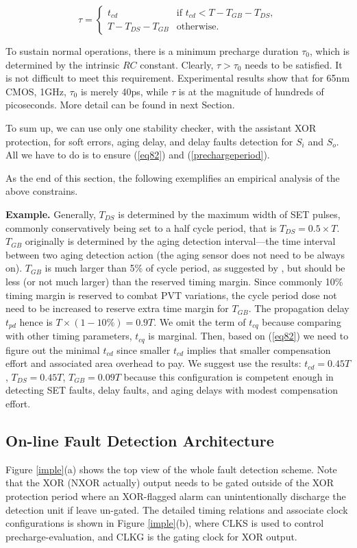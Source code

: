 \[\label{tao}
\tau = \left\{
\begin{array}{ll}
 t_{cd} & \mbox{if } t_{cd}<T-T_{GB}-T_{DS}, \\
 T-T_{DS}-T_{GB} & \mbox{otherwise}.
 \end{array} \right.
\]

To sustain normal operations, there is a minimum precharge duration $\tau_0$, which is determined by the intrinsic $RC$ constant. Clearly, $\tau > \tau_0$ needs to be satisfied. It is not difficult to meet this requirement. Experimental results show that for 65nm CMOS, 1GHz, $\tau_0$ is merely 40ps, while $\tau$ is at the magnitude of hundreds of picoseconds. More detail can be found in next Section.

To sum up, we can use only one stability checker, with the assistant XOR protection, for soft errors, aging delay, and delay faults detection for $S_i$ and $S_o$. All we have to do is to ensure (\ref{eq82}) and (\ref{prechargeperiod}).

As the end of this section, the following exemplifies an empirical analysis of the above constrains.

\vspace{0.3cm} {\bf Example.} Generally, $T_{DS}$ is determined by the maximum width of SET pulses, commonly conservatively being set to a half cycle period, that is $T_{DS}=0.5\times T$. $T_{GB}$ originally is determined by the aging detection interval---the time interval between two aging detection action (the aging sensor does not need to be always on).  $T_{GB}$ is much larger than 5\% of cycle period, as suggested by \cite{agarwal2007circuit}, but should be less (or not much larger) than the reserved timing margin. Since commonly 10\% timing margin is reserved to combat PVT variations, the cycle period dose not need to be increased to reserve extra time margin for $T_{GB}$. The propagation delay $t_{pd}$ hence is $T\times(1-10\%)=0.9T$. We omit the term of $t_{cq}$ because comparing with other timing parameters, $t_{cq}$ is marginal. Then, based on (\ref{eq82}) we need to figure out the minimal $t_{cd}$ since smaller $t_{cd}$ implies that smaller compensation effort and associated area overhead to pay. We suggest use the results: $t_{cd}=0.45T$, $T_{DS} = 0.45T$, $T_{GB}=0.09T$ because this configuration is competent enough in detecting SET faults, delay faults, and aging delays with modest compensation effort.

\subsection{On-line Fault Detection Architecture}
Figure \ref{imple}(a) shows the top view  of the whole fault detection scheme. Note that the XOR (NXOR actually) output needs to be gated outside of the XOR protection period where an XOR-flagged alarm can unintentionally discharge the detection unit if leave un-gated. The detailed timing relations and associate clock configurations is shown in Figure \ref{imple}(b), where CLKS is used to control precharge-evaluation, and CLKG is the gating clock for XOR output.

